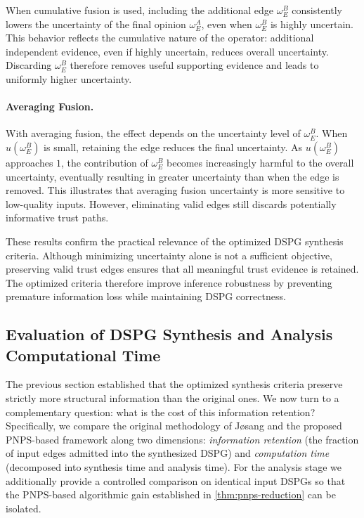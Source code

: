 When cumulative fusion is used, including the additional edge $\omega_E^B$ consistently lowers the uncertainty of the final opinion $\omega_E^A$, even when $\omega_E^B$ is highly uncertain. This behavior reflects the cumulative nature of the operator: additional independent evidence, even if highly uncertain, reduces overall uncertainty. Discarding $\omega_E^B$ therefore removes useful supporting evidence and leads to uniformly higher uncertainty.

\paragraph{Averaging Fusion.}
With averaging fusion, the effect depends on the uncertainty level of $\omega_E^B$. When $u(\omega_E^B)$ is small, retaining the edge reduces the final uncertainty. As $u(\omega_E^B)$ approaches $1$, the contribution of $\omega_E^B$ becomes increasingly harmful to the overall uncertainty, eventually resulting in greater uncertainty than when the edge is removed. This illustrates that averaging fusion uncertainty is more sensitive to low-quality inputs. However, eliminating valid edges still discards potentially informative trust paths.

These results confirm the practical relevance of the optimized \ac{DSPG} synthesis criteria. Although minimizing uncertainty alone is not a sufficient objective, preserving valid trust edges ensures that all meaningful trust evidence is retained. The optimized criteria therefore improve inference robustness by preventing premature information loss while maintaining \ac{DSPG} correctness.


\subsection{Evaluation of \acs{DSPG} Synthesis and Analysis Computational Time}
\label{subsec:eval_time}

The previous section established that the optimized synthesis criteria preserve strictly more structural information than the original ones. We now turn to a complementary question: what is the cost of this information retention? Specifically, we compare the original methodology of J{\o}sang and the proposed \ac{PNPS}-based framework along two dimensions: \emph{information retention} (the fraction of input edges admitted into the synthesized \ac{DSPG}) and \emph{computation time} (decomposed into synthesis time and analysis time). For the analysis stage we additionally provide a controlled comparison on identical input \acp{DSPG} so that the \ac{PNPS}-based algorithmic gain established in \cref{thm:pnps-reduction} can be isolated.

